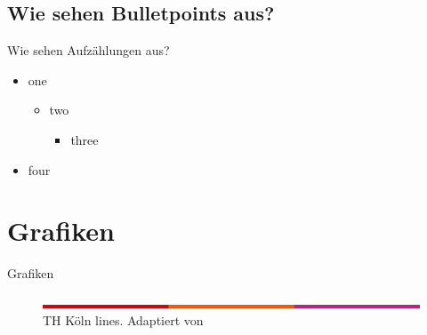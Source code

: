 \documentclass{beamer}
\begin{document}
\subsection{Wie sehen Bulletpoints aus?}\label{sec:itemize}
\begin{frame}{Wie sehen Aufzählungen aus?}
\begin{itemize}
\item one
\begin{itemize}
    \item two
    \begin{itemize}
        \item three
    \end{itemize}    
\end{itemize}    
\item four
\end{itemize}
\end{frame}

\section{Grafiken}\label{sec:graphics}
\begin{frame}{Grafiken}
    \begin{figure}\label{thk-linien}
        \includegraphics[width=\textwidth]{figures/thk-lines.png}
        \caption[TH Köln lines]{TH Köln lines. Adaptiert von \cite{source}}
    \end{figure}
\end{frame}
\end{document}
